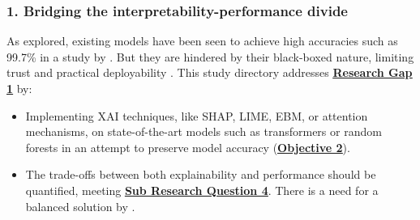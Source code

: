 
\subsubsection*{1. Bridging the interpretability-performance divide}
As explored, existing models have been seen to achieve high accuracies such as 99.7\% in a study by \cite{do2024integrated}. But they are hindered by their black-boxed nature, limiting trust and practical deployability \citep{atlam2022business}. This study directory addresses \hyperref[research-gap-1]{\uline{\textbf{Research Gap 1}}} by:

\begin{itemize}
  \item Implementing XAI techniques, like SHAP, LIME, EBM, or attention mechanisms, on state-of-the-art models such as transformers or random forests in an attempt to preserve model accuracy (\hyperref[objective-2]{\uline{\textbf{Objective 2}}}).
  \item The trade-offs between both explainability and performance should be quantified, meeting \hyperref[sub-research-q4]{\uline{\textbf{Sub Research Question 4}}}. There is a need for a balanced solution by \cite{alzahrani2024explainable}.
\end{itemize}
